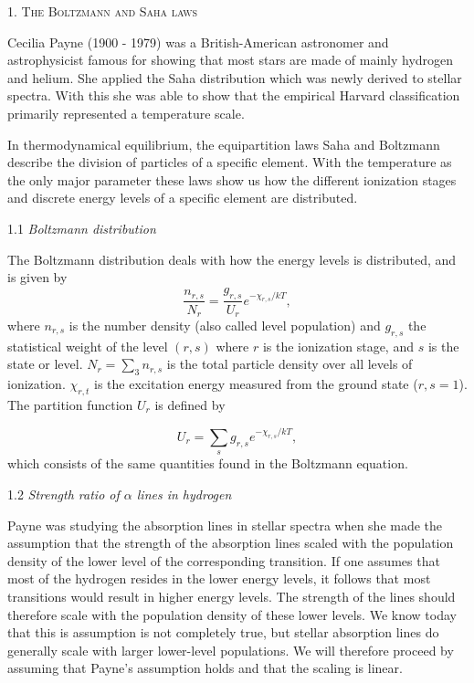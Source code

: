 \documentclass[a4paper,11.5pt,]{article}
\begin{document}
\begin{multicols}{2}

\begin{center}
\textsc{1. The Boltzmann and Saha laws}
\end{center}
Cecilia Payne (1900 - 1979) was a British-American astronomer and astrophysicist famous for showing that most stars are made of mainly hydrogen and helium. She applied the Saha distribution which was newly derived to stellar spectra. With this she was able to show that the empirical Harvard classification primarily represented a temperature scale.

In thermodynamical equilibrium, the equipartition laws Saha and Boltzmann describe the division of particles of a specific element. With the temperature as the only major parameter these laws show us how the different ionization stages and discrete energy levels of a specific element are distributed.

\begin{center}
1.1 \textit{Boltzmann distribution}
\end{center}
The Boltzmann distribution deals with how the energy levels is distributed, and is given by
\begin{equation}\label{eq:1}
    \frac{n_{r,s}}{N_r} = \frac{g_{r,s}}{U_r} e^{-\chi_{r,s}/kT},
\end{equation}
where $n_{r,s}$ is the number density (also called level population) and $g_{r,s}$ the statistical weight of the level $(r,s)$ where $r$ is the ionization stage, and $s$ is the state or level. $N_r = \sum_3 n_{r,s}$ is the total particle density over all levels of ionization. $\chi_{r,t}$ is the excitation energy measured from the ground state ($r,s=1$). The partition function $U_r$ is defined by

\begin{equation}\label{eq:2}
    U_r = \sum_s g_{r,s} e^{-\chi_{r,s}/kT},
\end{equation}
which consists of the same quantities found in the Boltzmann equation.

\begin{center}
1.2 \textit{Strength ratio of $\alpha$ lines in hydrogen}
\end{center}
Payne was studying the absorption lines in stellar spectra when she made the assumption that the strength of the absorption lines scaled with the population density of the lower level of the corresponding transition. If one assumes that most of the hydrogen resides in the lower energy levels, it follows that most transitions would result in higher energy levels. The strength of the lines should therefore scale with the population density of these lower levels. We know today that this is assumption is not completely true, but stellar absorption lines do generally scale with larger lower-level populations. We will therefore proceed by assuming that Payne's assumption holds and that the scaling is linear.


\end{multicols}
\end{document}
